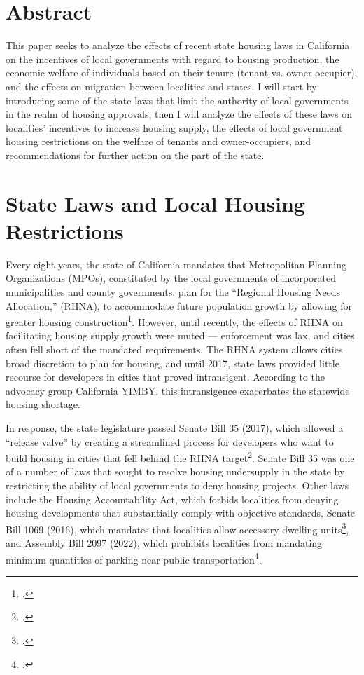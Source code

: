 \documentclass[12pt]{extarticle}
\title{}
\author{Avinash Iyer}
\date{}
\newlength\tindent
\renewcommand{\indent}{\hspace*{\tindent}}
\begin{document}
  \doublespacing
  \section*{Abstract}
  This paper seeks to analyze the effects of recent state housing laws in California on the incentives of local governments with regard to housing production, the economic welfare of individuals based on their tenure (tenant vs. owner-occupier), and the effects on migration between localities and states. I will start by introducing some of the state laws that limit the authority of local governments in the realm of housing approvals, then I will analyze the effects of these laws on localities' incentives to increase housing supply, the effects of local government housing restrictions on the welfare of tenants and owner-occupiers, and recommendations for further action on the part of the state.
  \section*{State Laws and Local Housing Restrictions}%
  Every eight years, the state of California mandates that Metropolitan Planning Organizations (MPOs), constituted by the local governments of incorporated municipalities and county governments, plan for the ``Regional Housing Needs Allocation,'' (RHNA), to accommodate future population growth by allowing for greater housing construction\footcite{rhna}. However, until recently, the effects of RHNA on facilitating housing supply growth were muted --- enforcement was lax, and cities often fell short of the mandated requirements. The RHNA system allows cities broad discretion to plan for housing, and until 2017, state laws provided little recourse for developers in cities that proved intransigent. According to the advocacy group California YIMBY, this intransigence exacerbates the statewide housing shortage.

  \indent In response, the state legislature passed Senate Bill 35 (2017), which allowed a ``release valve'' by creating a streamlined process for developers who want to build housing in cities that fell behind the RHNA target\footcite{sb_35_423}. Senate Bill 35 was one of a number of laws that sought to resolve housing undersupply in the state by restricting the ability of local governments to deny housing projects. Other laws include the Housing Accountability Act, which forbids localities from denying housing developments that substantially comply with objective standards, Senate Bill 1069 (2016), which mandates that localities allow accessory dwelling units\footcite{sb_1069}, and Assembly Bill 2097 (2022), which prohibits localities from mandating minimum quantities of parking near public transportation\footcite{ab_2097}.
\end{document}

